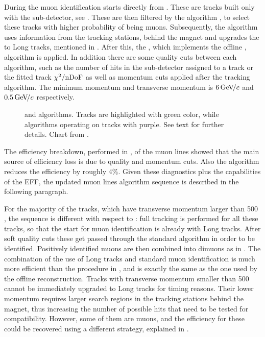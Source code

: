 During \runone the muon identification starts directly from \veloTracks. These are tracks built only with
the \velo sub-detector, see . These \veloTracks are then filtered by the \mvm algorithm
\cite{LHCb-PUB-2011-017}, to select these tracks with higher probability of being muons. Subsequently,
the \FwD algorithm uses information from the tracking stations, behind
the magnet and upgrades the \veloTracks to Long tracks, mentioned in . After this, the
\isMuon, which implements the offline \muonID, algorithm is applied. In addition there are some quality cuts
between each algorithm, such as the number of hits in the \velo sub-detector assigned to a track or the fitted
track $\chi^2/\rm nDoF$ as well as momentum cuts applied after the \FwD tracking algorithm. The minimum momentum
and transverse momentum is $6 {\mathrm{\,Ge\kern -0.1em V\!/}c}$ and $0.5 {\mathrm{\,Ge\kern -0.1em V\!/}c}$ respectively.

\begin{figure}[t]
  \centering
  \scalebox{0.97}{}
  \scalebox{0.97}{}
 \caption{\runone and \runtwo \hltone algorithms. Tracks are highlighted with green color, while algorithms
           operating on tracks with purple. See text for further details. Chart from \cite{kevinThesis}.}
  \label{hlt1_algo_seq}
\end{figure}

The efficiency breakdown, performed in \cite{kevinThesis}, of the \runone \hltone muon lines showed that the
main source of efficiency loss is due to quality and momentum cuts. Also the \mvm algorithm reduces the
efficiency by roughly $4\%$. Given these diagnostics plus the \runtwo capabilities of the EFF, the updated
\hltone muon lines algorithm sequence is described in the following paragraph.

For the majority of the tracks, which have transverse momentum larger than 500 \mevc, the sequence is different with respect to
\runone: full tracking is performed for all these tracks, so that the start for muon identification is already with Long tracks.
After soft quality cuts these get passed through the standard \isMuon algorithm in order to be identified.
Positively identified muons are then combined into dimuons as in \runone.
The combination of the use of Long tracks and standard muon identification is much more efficient than the
procedure in \runone, and is exactly the same as the one used by the offline reconstruction.
Tracks with transverse momentum smaller than 500 \mevc cannot be immediately upgraded to Long tracks
for timing reasons. Their lower momentum requires larger search regions in the tracking stations
behind the magnet, thus increasing the number of possible hits that need to be tested for compatibility.
However, some of them are muons, and the efficiency for these could be recovered using a different strategy,
explained in .
